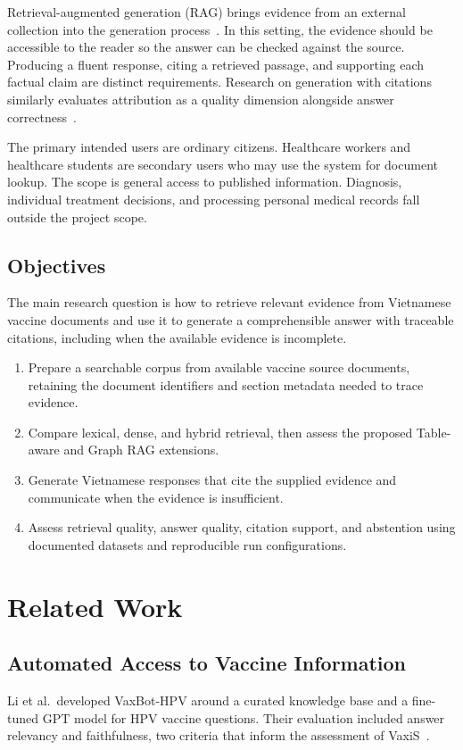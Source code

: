 \documentclass[sn-mathphys, oneside]{sn-jnl}
\begin{document}
Retrieval-augmented generation (RAG) brings evidence from an external collection into the generation process~\cite{lewis2020rag}. In this setting, the evidence should be accessible to the reader so the answer can be checked against the source. Producing a fluent response, citing a retrieved passage, and supporting each factual claim are distinct requirements. Research on generation with citations similarly evaluates attribution as a quality dimension alongside answer correctness~\cite{gao2023citations}.

The primary intended users are ordinary citizens. Healthcare workers and healthcare students are secondary users who may use the system for document lookup. The scope is general access to published information. Diagnosis, individual treatment decisions, and processing personal medical records fall outside the project scope.

\subsection{Objectives}
The main research question is how to retrieve relevant evidence from Vietnamese vaccine documents and use it to generate a comprehensible answer with traceable citations, including when the available evidence is incomplete.

\begin{enumerate}
\item Prepare a searchable corpus from available vaccine source documents, retaining the document identifiers and section metadata needed to trace evidence.
\item Compare lexical, dense, and hybrid retrieval, then assess the proposed Table-aware and Graph RAG extensions.
\item Generate Vietnamese responses that cite the supplied evidence and communicate when the evidence is insufficient.
\item Assess retrieval quality, answer quality, citation support, and abstention using documented datasets and reproducible run configurations.
\end{enumerate}

%
\section{Related Work}

\subsection{Automated Access to Vaccine Information}
Li et al.\ developed VaxBot-HPV around a curated knowledge base and a fine-tuned GPT model for HPV vaccine questions. Their evaluation included answer relevancy and faithfulness, two criteria that inform the assessment of VaxiS~\cite{li2025vaxbothpv}.
\end{document}
